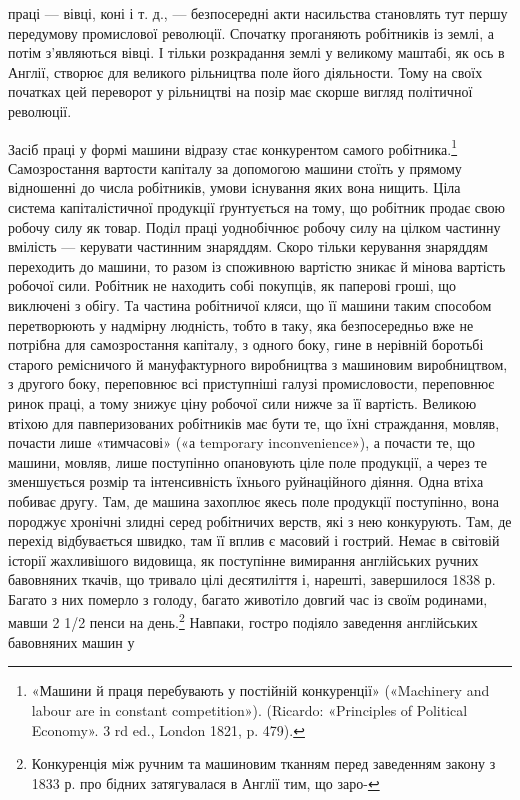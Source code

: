 праці — вівці, коні і т. д., — безпосередні акти насильства становлять
тут першу передумову промислової революції. Спочатку
проганяють робітників із землі, а потім з’являються вівці. І тільки
розкрадання землі у великому маштабі, як ось в Англії, створює
для великого рільництва поле його діяльности. Тому на своїх
початках цей переворот у рільництві на позір має скорше вигляд
політичної революції.

Засіб праці у формі машини відразу стає конкурентом самого
робітника.\footnote{
«Машини й праця перебувають у постійній конкуренції» («Machinery
and labour are in constant competition»). (Ricardo: «Principles of
Political Economy». 3 rd ed., London 1821, p. 479).
} Самозростання вартости капіталу за допомогою
машини стоїть у прямому відношенні до числа робітників, умови
існування яких вона нищить. Ціла система капіталістичної продукції
ґрунтується на тому, що робітник продає свою робочу силу
як товар. Поділ праці уоднобічнює робочу силу на цілком частинну
вмілість — керувати частинним знаряддям. Скоро тільки
керування знаряддям переходить до машини, то разом із споживною
вартістю зникає й мінова вартість робочої сили. Робітник не
находить собі покупців, як паперові гроші, що виключені з обігу.
Та частина робітничої кляси, що її машини таким способом перетворюють
у надмірну людність, тобто в таку, яка безпосередньо
вже не потрібна для самозростання капіталу, з одного боку, гине
в нерівній боротьбі старого ремісничого й мануфактурного виробництва
з машиновим виробництвом, з другого боку, переповнює
всі приступніші галузі промисловости, переповнює ринок праці,
а тому знижує ціну робочої сили нижче за її вартість. Великою
втіхою для павперизованих робітників має бути те, що їхні страждання,
мовляв, почасти лише «тимчасові» («а temporary inconvenience»),
а почасти те, що машини, мовляв, лише поступінно
опановують ціле поле продукції, а через те зменшується розмір
та інтенсивність їхнього руйнаційного діяння. Одна втіха побиває
другу. Там, де машина захоплює якесь поле продукції поступінно,
вона породжує хронічні злидні серед робітничих верств, які з
нею конкурують. Там, де перехід відбувається швидко, там її
 вплив є масовий і гострий. Немає в світовій історії жахливішого
видовища, як поступінне вимирання англійських ручних бавовняних
ткачів, що тривало цілі десятиліття і, нарешті, завершилося
1838 р. Багато з них померло з голоду, багато животіло довгий
час із своїм родинами, мавши 2 1/2 пенси на день.\footnote{
Конкуренція між ручним та машиновим тканням перед заведенням
закону з 1833 р. про бідних затягувалася в Англії тим, що заро-
} Навпаки,
гостро подіяло заведення англійських бавовняних машин у